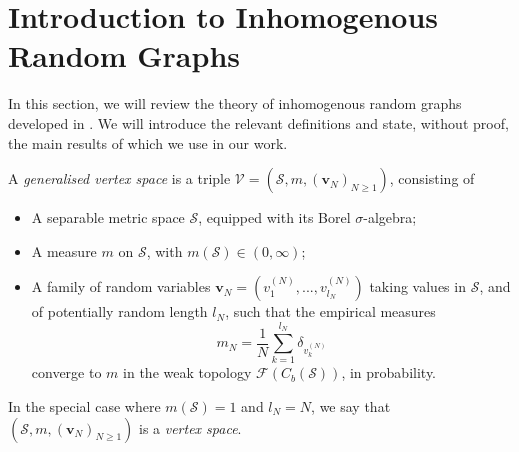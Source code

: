 
\section{Introduction to Inhomogenous Random Graphs}\label{sec: IRG}
In this section, we will review the theory of inhomogenous random graphs developed in \cite{BJR07}. We will introduce the relevant definitions and state, without proof, the main results of \cite{BJR07} which we use in our work.
\begin{definition} \label{def: Generalised vertex space} A \emph{generalised vertex space} is a triple $\mathcal{V}=(\mathcal{S}, m, (\mathbf{v}_N)_{N\geq 1})$, consisting of \begin{itemize}
    \item A separable metric space $\mathcal{S}$, equipped with its Borel $\sigma$-algebra;
    \item A measure $m$ on $\mathcal{S}$, with $m(\mathcal{S}) \in (0, \infty)$; 
    \item A family of random variables $\mathbf{v}_N=(v^{(N)}_1,...,v^{(N)}_{l_N})$ taking values in $\mathcal{S}$, and of potentially random length $l_N$,  such that the empirical measures \begin{equation}
        m_N=\frac{1}{N}\sum_{k=1}^{l_N} \delta_{v^{(N)}_k} \end{equation} converge to $m$ in the weak topology $\mathcal{F}(C_b(\mathcal{S}))$, in probability.

\end{itemize} In the special case where $m(\mathcal{S})=1$ and $l_N=N$, we say that $(\mathcal{S}, m, (\mathbf{v}_N)_{N\geq 1})$ is a \emph{vertex space}. \end{definition}  
